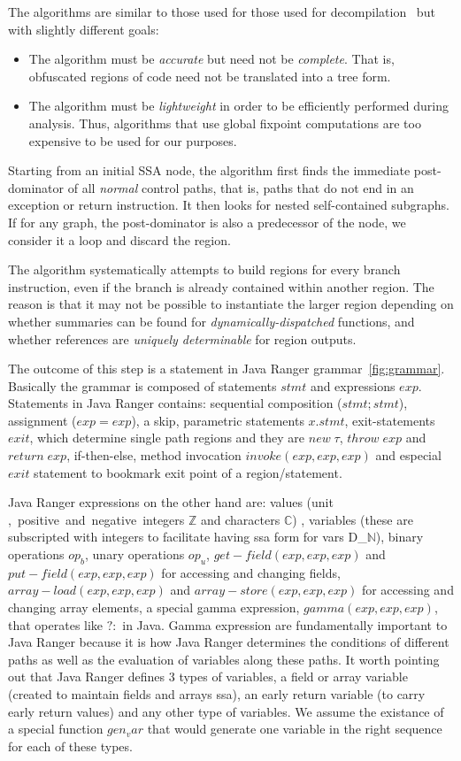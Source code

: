 The algorithms are similar to those used for those used for decompilation~\cite{Yakdan15@decompilation} but with slightly different goals: 
\begin{itemize}
    \item The algorithm must be {\em accurate} but need not be {\em complete}.  That is, obfuscated regions of code need not be translated into a tree form.
    \item The algorithm must be {\em lightweight} in order to be efficiently performed during analysis.  Thus, algorithms that use global fixpoint computations are 
        too expensive to be used for our purposes.
\end{itemize}

Starting from an initial SSA node, the algorithm first finds the immediate post-dominator of all {\em normal} control paths, that is, paths that do not end in an exception or return instruction.  It then looks for nested self-contained subgraphs.  If for any graph, the post-dominator is also a predecessor of the node, we consider it a loop and discard the region.  

The algorithm systematically attempts to build regions for every branch instruction, even if the branch is already contained within another region.  The reason is that it may not be possible to instantiate the larger region depending on whether summaries can be found for {\em dynamically-dispatched} functions, and whether references are {\em uniquely determinable} for region outputs.

The outcome of this step is a statement in Java Ranger grammar~\ref{fig:grammar}. Basically the grammar is composed of statements $stmt$ and expressions $exp$. Statements in Java Ranger contains: sequential composition ($stmt;stmt$), assignment ($exp = exp$), a skip, parametric statements $x.stmt$, exit-statements $exit$, which determine single path regions and they are $new\; \tau$, $throw\; exp$ and $return\; exp$, if-then-else, method invocation $invoke(exp, exp, exp)$ and especial $exit$ statement to bookmark exit point of a region/statement. 

Java Ranger expressions on the other hand are: values (unit \unit, positive and negative integers $\mathbb{Z}$ and characters $\mathbb{C}$) , variables (these are subscripted with integers to facilitate having ssa form for vars D_$\mathbb{N}$), binary operations $op_b$, unary operations $op_u$,  $get-field(exp, exp, exp)$ and $put-field(exp, exp, exp)$ for accessing and changing fields,  $array-load(exp, exp, exp)$ and  $array-store(exp, exp, exp)$ for accessing and changing array elements, a special gamma expression, $gamma(exp, exp, exp)$, that operates like $?:$ in Java. Gamma expression are fundamentally important to Java Ranger because it is how Java Ranger determines the conditions of different paths as well as the evaluation of variables along these paths.  
It worth pointing out that Java Ranger defines 3 types of variables, a field or array variable (created to maintain fields and arrays ssa), an early return variable (to carry early return values) and any other type of variables. We assume the existance of a special function $gen_var$ that would generate one variable in the right sequence for each of these types. 

